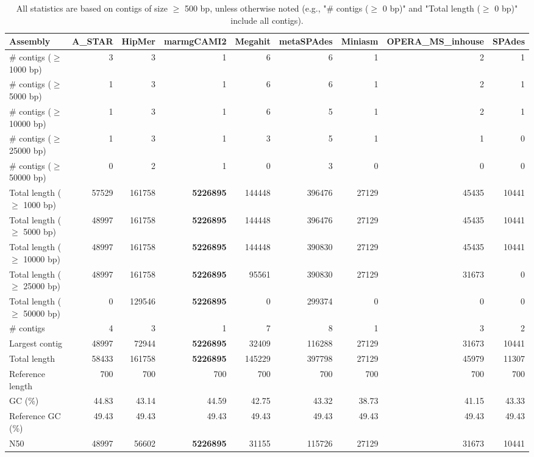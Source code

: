 \documentclass[12pt,a4paper]{article}
\begin{document}
\begin{table}[ht]
\begin{center}
\caption{All statistics are based on contigs of size $\geq$ 500 bp, unless otherwise noted (e.g., "\# contigs ($\geq$ 0 bp)" and "Total length ($\geq$ 0 bp)" include all contigs).}
\begin{tabular}{|l*{8}{|r}|}
\hline
Assembly & A\_STAR & HipMer & marmgCAMI2 & Megahit & metaSPAdes & Miniasm & OPERA\_MS\_inhouse & SPAdes \\ \hline
\# contigs ($\geq$ 1000 bp) & 3 & 3 & 1 & 6 & 6 & 1 & 2 & 1 \\ \hline
\# contigs ($\geq$ 5000 bp) & 1 & 3 & 1 & 6 & 6 & 1 & 2 & 1 \\ \hline
\# contigs ($\geq$ 10000 bp) & 1 & 3 & 1 & 6 & 5 & 1 & 2 & 1 \\ \hline
\# contigs ($\geq$ 25000 bp) & 1 & 3 & 1 & 3 & 5 & 1 & 1 & 0 \\ \hline
\# contigs ($\geq$ 50000 bp) & 0 & 2 & 1 & 0 & 3 & 0 & 0 & 0 \\ \hline
Total length ($\geq$ 1000 bp) & 57529 & 161758 & {\bf 5226895} & 144448 & 396476 & 27129 & 45435 & 10441 \\ \hline
Total length ($\geq$ 5000 bp) & 48997 & 161758 & {\bf 5226895} & 144448 & 396476 & 27129 & 45435 & 10441 \\ \hline
Total length ($\geq$ 10000 bp) & 48997 & 161758 & {\bf 5226895} & 144448 & 390830 & 27129 & 45435 & 10441 \\ \hline
Total length ($\geq$ 25000 bp) & 48997 & 161758 & {\bf 5226895} & 95561 & 390830 & 27129 & 31673 & 0 \\ \hline
Total length ($\geq$ 50000 bp) & 0 & 129546 & {\bf 5226895} & 0 & 299374 & 0 & 0 & 0 \\ \hline
\# contigs & 4 & 3 & 1 & 7 & 8 & 1 & 3 & 2 \\ \hline
Largest contig & 48997 & 72944 & {\bf 5226895} & 32409 & 116288 & 27129 & 31673 & 10441 \\ \hline
Total length & 58433 & 161758 & {\bf 5226895} & 145229 & 397798 & 27129 & 45979 & 11307 \\ \hline
Reference length & 700 & 700 & 700 & 700 & 700 & 700 & 700 & 700 \\ \hline
GC (\%) & 44.83 & 43.14 & 44.59 & 42.75 & 43.32 & 38.73 & 41.15 & 43.33 \\ \hline
Reference GC (\%) & 49.43 & 49.43 & 49.43 & 49.43 & 49.43 & 49.43 & 49.43 & 49.43 \\ \hline
N50 & 48997 & 56602 & {\bf 5226895} & 31155 & 115726 & 27129 & 31673 & 10441 \\ \hline

\end{tabular}
\end{center}
\end{table}
\end{document}
